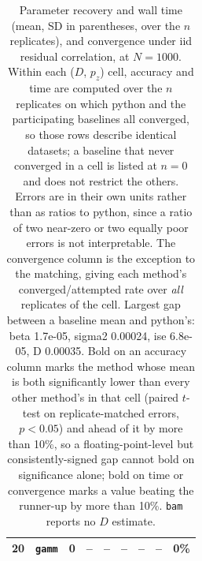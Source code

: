 \begin{table}[t]
\begin{tabular}{rlrrrrrrr}
20 & \texttt{gamm} & 0 & -- & -- & -- & -- & -- & 0\% \\
\bottomrule
\end{tabular}
\caption{Parameter recovery and wall time (mean, SD in parentheses, over the $n$ replicates), and convergence under iid residual correlation, at $N=1000$. Within each ($D$, $p_z$) cell, accuracy and time are computed over the $n$ replicates on which python and the participating baselines all converged, so those rows describe identical datasets; a baseline that never converged in a cell is listed at $n=0$ and does not restrict the others. Errors are in their own units rather than as ratios to python, since a ratio of two near-zero or two equally poor errors is not interpretable. The convergence column is the exception to the matching, giving each method's converged/attempted rate over \emph{all} replicates of the cell. Largest gap between a baseline mean and python's: beta 1.7e-05, sigma2 0.00024, ise 6.8e-05, D 0.00035. Bold on an accuracy column marks the method whose mean is both significantly lower than every other method's in that cell (paired $t$-test on replicate-matched errors, $p<0.05$) and ahead of it by more than 10\%, so a floating-point-level but consistently-signed gap cannot bold on significance alone; bold on time or convergence marks a value beating the runner-up by more than 10\%. \texttt{bam} reports no $D$ estimate.}
\label{tab:randeff-param}
\end{table}
